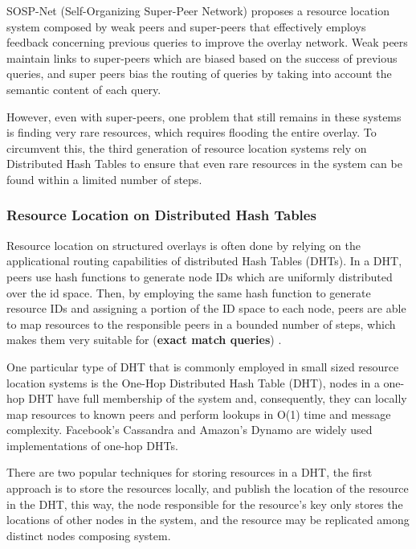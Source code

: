 SOSP-Net \cite{garbacki2007optimizing}  (Self-Organizing Super-Peer Network) proposes a resource location system composed by weak peers and super-peers that effectively employs feedback concerning previous queries to improve the overlay network. Weak peers maintain links to super-peers which are biased based on the success of previous queries, and super peers bias the routing of queries by taking into account the semantic content of each query. 

However, even with super-peers, one problem that still remains in these systems is finding very rare resources, which requires flooding the entire overlay. To circumvent this, the third generation of resource location systems rely on Distributed Hash Tables to ensure that even rare resources in the system can be found within a limited number of steps.

\subsubsection{Resource Location on Distributed Hash Tables}

Resource location on structured overlays is often done by relying on the applicational routing capabilities of distributed Hash Tables (DHTs). In a DHT, peers use hash functions to generate node IDs which are uniformly distributed over the id space. Then, by employing the same hash function to generate resource IDs and assigning a portion of the ID space to each node, peers are able to map resources to the responsible peers in a bounded number of steps, which makes them very suitable for (\textbf{exact match queries}) \cite{leitaoPHDthesis}. 

One particular type of DHT that is commonly employed in small sized resource location systems is the One-Hop Distributed Hash Table (DHT), nodes in a one-hop DHT have full membership of the system and, consequently, they can locally map resources to known peers and perform lookups in O(1) time and message complexity. Facebook's Cassandra \cite{lakshman2010cassandra} and Amazon's Dynamo \cite{decandia2007dynamo} are widely used implementations of one-hop DHTs. 

There are two popular techniques for storing resources in a DHT, the first approach is to store the resources locally, and publish the location of the resource in the DHT, this way, the node responsible for the resource's key only stores the locations of other nodes in the system, and the resource may be replicated among distinct nodes composing system. 

